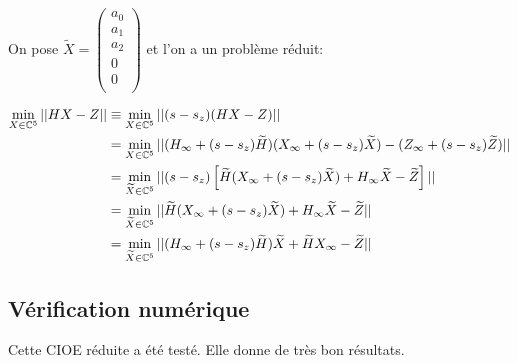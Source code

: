 On pose $\tilde{X} = \begin{pmatrix}
  a_0\\
  a_1\\
  a_2\\
  0\\
  0\\
  \end{pmatrix}$ et l'on a un problème réduit:


\begin{align*}
\min\limits_{X\in\mathbb C^5}{||HX-Z||} 
&\equiv \min\limits_{X\in\mathbb C^5}{||(s-s_z)(HX-Z)||} \\
&= \min\limits_{X\in\mathbb C^5}{||(H_\infty + (s-s_z)\widetilde{H})(X_\infty + (s-s_z)\widetilde{X})-(Z_\infty + (s-s_z)\widetilde{Z})||}\\
&= \min\limits_{\widetilde{X}\in\mathbb C^5}{||(s-s_z)\left[\widetilde{H}(X_\infty + (s-s_z)\widetilde{X}) + H_\infty\widetilde{X} - \widetilde{Z}\right]||}\\
&= \min\limits_{\widetilde{X}\in\mathbb C^5}{||\widetilde{H}(X_\infty + (s-s_z)\widetilde{X}) + H_\infty\widetilde{X} - \widetilde{Z}||}\\
&= \min\limits_{\widetilde{X}\in\mathbb C^5}{||(H_\infty + (s-s_z)\widetilde{H})\widetilde{X} + \widetilde{H}X_\infty - \widetilde{Z}||}\\
\end{align*}

\subsection{Vérification numérique}
Cette CIOE réduite a été testé. Elle donne de très bon résultats.
